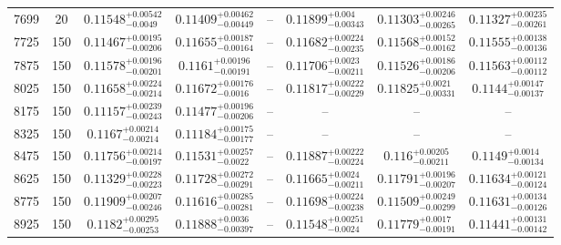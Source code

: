 \documentclass[twocolumn]{aastex63}
\begin{document}
\begin{table*}[ht!]
\begin{tabular}{cccccccc}
7699     &       20 &   $0.11548^{+0.00542}_{-0.0049}$ &  $0.11409^{+0.00462}_{-0.00449}$ &                              -- &    $0.11899^{+0.004}_{-0.00343}$ &  $0.11303^{+0.00246}_{-0.00265}$ &  $0.11327^{+0.00235}_{-0.00261}$ \\
7725     &      150 &  $0.11467^{+0.00195}_{-0.00206}$ &  $0.11655^{+0.00187}_{-0.00164}$ &                              -- &  $0.11682^{+0.00224}_{-0.00235}$ &  $0.11568^{+0.00152}_{-0.00162}$ &  $0.11555^{+0.00138}_{-0.00136}$ \\
7875     &      150 &  $0.11578^{+0.00196}_{-0.00201}$ &   $0.1161^{+0.00196}_{-0.00191}$ &                              -- &   $0.11706^{+0.0023}_{-0.00211}$ &  $0.11526^{+0.00186}_{-0.00206}$ &  $0.11563^{+0.00112}_{-0.00112}$ \\
8025     &      150 &  $0.11658^{+0.00224}_{-0.00214}$ &   $0.11672^{+0.00176}_{-0.0016}$ &                              -- &  $0.11817^{+0.00222}_{-0.00229}$ &   $0.11825^{+0.0021}_{-0.00331}$ &   $0.1144^{+0.00147}_{-0.00137}$ \\
8175     &      150 &  $0.11157^{+0.00239}_{-0.00243}$ &  $0.11477^{+0.00196}_{-0.00206}$ &                              -- &                              -- &                              -- &                              -- \\
8325     &      150 &   $0.1167^{+0.00214}_{-0.00214}$ &  $0.11184^{+0.00175}_{-0.00177}$ &                              -- &                              -- &                              -- &                              -- \\
8475     &      150 &  $0.11756^{+0.00214}_{-0.00197}$ &   $0.11531^{+0.00257}_{-0.0022}$ &                              -- &  $0.11887^{+0.00222}_{-0.00224}$ &    $0.116^{+0.00205}_{-0.00211}$ &    $0.1149^{+0.0014}_{-0.00134}$ \\
8625     &      150 &  $0.11329^{+0.00228}_{-0.00223}$ &  $0.11728^{+0.00272}_{-0.00291}$ &                              -- &   $0.11665^{+0.0024}_{-0.00211}$ &  $0.11791^{+0.00196}_{-0.00207}$ &  $0.11634^{+0.00121}_{-0.00124}$ \\
8775     &      150 &  $0.11909^{+0.00207}_{-0.00246}$ &  $0.11616^{+0.00285}_{-0.00281}$ &                              -- &  $0.11698^{+0.00224}_{-0.00238}$ &  $0.11509^{+0.00249}_{-0.00299}$ &  $0.11631^{+0.00134}_{-0.00126}$ \\
8925     &      150 &   $0.1182^{+0.00295}_{-0.00253}$ &   $0.11888^{+0.0036}_{-0.00397}$ &                              -- &   $0.11548^{+0.00251}_{-0.0024}$ &   $0.11779^{+0.0017}_{-0.00191}$ &  $0.11441^{+0.00131}_{-0.00142}$ \\

\end{tabular}
\end{table*}
\end{document}
